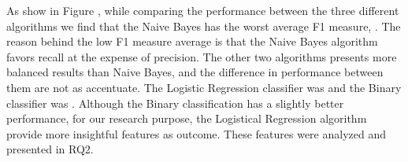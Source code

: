 As show in Figure \todo{}, while comparing the performance between the three different algorithms we find that the Naive Bayes has the worst average F1 measure, \todo{}. The reason behind the low F1 measure average is that the Naive Bayes algorithm favors recall at the expense of precision. The other two algorithms presents more balanced results than Naive Bayes, and the difference in performance between them are not as accentuate. The Logistic Regression classifier was \todo{} and the Binary classifier was \todo{}. Although the Binary classification has a slightly better performance, for our research purpose, the Logistical Regression algorithm provide more insightful features as outcome. These features were analyzed and presented in RQ2. 